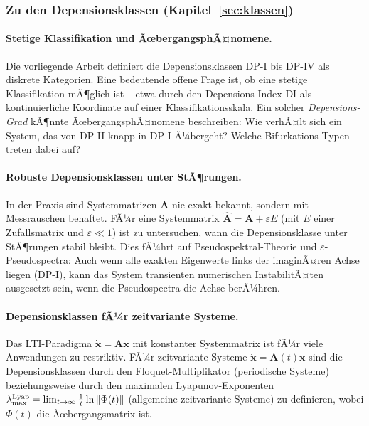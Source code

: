 ﻿\documentclass[12pt, a4paper]{article}
\theoremstyle{definition}
\theoremstyle{remark}
\newcommand{\vx}{\bm{x}}
\newcommand{\vA}{\bm{A}}
\begin{document}
\subsubsection{Zu den Depensionsklassen (Kapitel~\ref{sec:klassen})}

\paragraph{Stetige Klassifikation und ÃœbergangsphÃ¤nomene.}
Die vorliegende Arbeit definiert die Depensionsklassen DP-I bis DP-IV als diskrete
Kategorien. Eine bedeutende offene Frage ist, ob eine stetige Klassifikation mÃ¶glich
ist -- etwa durch den Depensions-Index DI als kontinuierliche Koordinate auf einer
Klassifikationsskala. Ein solcher \emph{Depensions-Grad} kÃ¶nnte ÃœbergangsphÃ¤nomene
beschreiben: Wie verhÃ¤lt sich ein System, das von DP-II knapp in DP-I Ã¼bergeht?
Welche Bifurkations-Typen treten dabei auf?

\paragraph{Robuste Depensionsklassen unter StÃ¶rungen.}
In der Praxis sind Systemmatrizen $\vA$ nie exakt bekannt, sondern mit Messrauschen
behaftet. FÃ¼r eine Systemmatrix $\hat{\vA} = \vA + \varepsilon E$ (mit $E$ einer
Zufallsmatrix und $\varepsilon \ll 1$) ist zu untersuchen, wann die Depensionsklasse
unter StÃ¶rungen stabil bleibt. Dies fÃ¼hrt auf Pseudospektral-Theorie und
$\varepsilon$-Pseudospectra: Auch wenn alle exakten Eigenwerte links der imaginÃ¤ren
Achse liegen (DP-I), kann das System transienten numerischen InstabilitÃ¤ten ausgesetzt
sein, wenn die Pseudospectra die Achse berÃ¼hren.

\paragraph{Depensionsklassen fÃ¼r zeitvariante Systeme.}
Das LTI-Paradigma $\dot{\vx} = \vA\vx$ mit konstanter Systemmatrix ist fÃ¼r viele
Anwendungen zu restriktiv. FÃ¼r zeitvariante Systeme $\dot{\vx} = \vA(t)\vx$ sind
die Depensionsklassen durch den Floquet-Multiplikator (periodische Systeme) beziehungsweise
durch den maximalen Lyapunov-Exponenten $\lambda_{\max}^{\rm Lyap} = \lim_{t\to\infty}
\frac{1}{t}\ln\|\Phi(t)\|$ (allgemeine zeitvariante Systeme) zu definieren, wobei
$\Phi(t)$ die Ãœbergangsmatrix ist.
\end{document}
